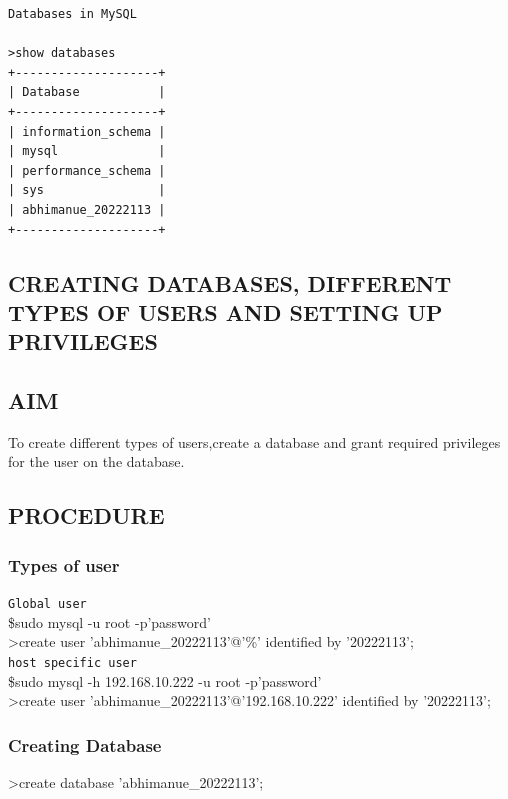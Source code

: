\documentclass{article}
\begin{document}
\newpage
{}
\begin{verbatim}
Databases in MySQL 

>show databases
+--------------------+
| Database           |
+--------------------+
| information_schema |
| mysql              |
| performance_schema |
| sys                |
| abhimanue_20222113 |
+--------------------+

\end{verbatim}
\newpage
\begin{flushleft}
\section{CREATING DATABASES, DIFFERENT TYPES OF USERS AND SETTING UP PRIVILEGES}
\hrulefill
\vspace{1cm}

\subsection{AIM}
To create different types of users,create a database and grant required privileges for the user on the database.
\subsection{PROCEDURE}
\subsubsection{Types of user}
\vspace{0.1in}\texttt{Global user}\\
\hspace{0.5in} \$sudo mysql -u root -p'password'\\
\hspace{0.6in} \textgreater create user 'abhimanue\_20222113'@'\%' identified by '20222113';\\

\vspace{0.1in}\texttt{host specific user}\\
\hspace{0.5in} \$sudo mysql -h 192.168.10.222 -u root -p'password'\\
\hspace{0.6in} \textgreater create user 'abhimanue\_20222113'@'192.168.10.222' identified by '20222113';

\subsubsection{Creating Database}
\hspace{0.5in} \textgreater create database 'abhimanue\_20222113'; \\


\end{flushleft}
\end{document}
